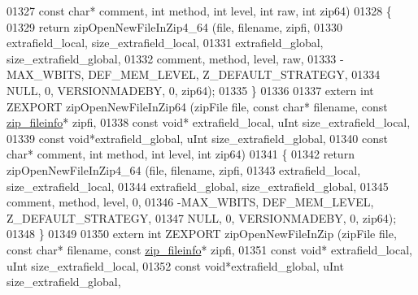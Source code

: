 \begin{DoxyCode}
01327                                         \textcolor{keyword}{const} \textcolor{keywordtype}{char}* comment, \textcolor{keywordtype}{int} method, \textcolor{keywordtype}{int} level, \textcolor{keywordtype}{int} raw, \textcolor{keywordtype}{int} zip64)
01328 \{
01329     \textcolor{keywordflow}{return} zipOpenNewFileInZip4\_64 (file, filename, zipfi,
01330                                  extrafield\_local, size\_extrafield\_local,
01331                                  extrafield\_global, size\_extrafield\_global,
01332                                  comment, method, level, raw,
01333                                  -MAX\_WBITS, DEF\_MEM\_LEVEL, Z\_DEFAULT\_STRATEGY,
01334                                  NULL, 0, VERSIONMADEBY, 0, zip64);
01335 \}
01336 
01337 \textcolor{keyword}{extern} \textcolor{keywordtype}{int} ZEXPORT zipOpenNewFileInZip64 (zipFile file, \textcolor{keyword}{const} \textcolor{keywordtype}{char}* filename, \textcolor{keyword}{const} 
      \hyperlink{structzip__fileinfo}{zip\_fileinfo}* zipfi,
01338                                         \textcolor{keyword}{const} \textcolor{keywordtype}{void}* extrafield\_local, uInt size\_extrafield\_local,
01339                                         \textcolor{keyword}{const} \textcolor{keywordtype}{void}*extrafield\_global, uInt size\_extrafield\_global,
01340                                         \textcolor{keyword}{const} \textcolor{keywordtype}{char}* comment, \textcolor{keywordtype}{int} method, \textcolor{keywordtype}{int} level, \textcolor{keywordtype}{int} zip64)
01341 \{
01342     \textcolor{keywordflow}{return} zipOpenNewFileInZip4\_64 (file, filename, zipfi,
01343                                  extrafield\_local, size\_extrafield\_local,
01344                                  extrafield\_global, size\_extrafield\_global,
01345                                  comment, method, level, 0,
01346                                  -MAX\_WBITS, DEF\_MEM\_LEVEL, Z\_DEFAULT\_STRATEGY,
01347                                  NULL, 0, VERSIONMADEBY, 0, zip64);
01348 \}
01349 
01350 \textcolor{keyword}{extern} \textcolor{keywordtype}{int} ZEXPORT zipOpenNewFileInZip (zipFile file, \textcolor{keyword}{const} \textcolor{keywordtype}{char}* filename, \textcolor{keyword}{const} 
      \hyperlink{structzip__fileinfo}{zip\_fileinfo}* zipfi,
01351                                         \textcolor{keyword}{const} \textcolor{keywordtype}{void}* extrafield\_local, uInt size\_extrafield\_local,
01352                                         \textcolor{keyword}{const} \textcolor{keywordtype}{void}*extrafield\_global, uInt size\_extrafield\_global,

\end{DoxyCode}
